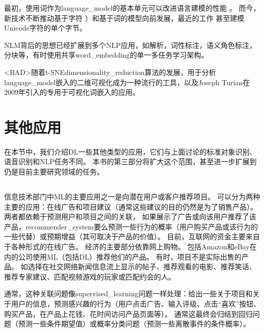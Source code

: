 
最初，使用词作为\gls{language_model}的基本单元可以改进语言建模的性能 \citep{BenDucVin01-small}。
而今，新技术不断推动基于字符 \citep{Sutskever-et-al-ICML2011}）和基于词的模型向前发展，最近的工作 \citep{gillick2015multilingual}甚至建模Unicode字符的单个字节。

\gls{NLM}背后的思想已经扩展到多个\gls{NLP}应用，如解析\citep{Henderson-NAACL2003,Henderson-ACL2004,Collobert-AISTATS2011}，词性标注，语义角色标注，分块等，有时使用共享\gls{word_embedding}的单一多任务学习架构\citep{Collobert+Weston-ICML2008,collobert2011natural}。

<BAD>随着t-SNE\gls{dimensionality_reduction}算法的发展\citep{VanDerMaaten08-small}，用于分析\gls{language_model}嵌入的二维可视化成为一种流行的工具，以及Joseph Turian在2009年引入的专用于可视化词嵌入的应用。

\section{其他应用}
\label{sec:other_applications}

在本节中，我们介绍\gls{DL}一些其他类型的应用，它们与上面讨论的标准对象识别、语音识别和\gls{NLP}任务不同。
本书的第三部分将扩大这个范围，甚至进一步扩展到仍是目前主要研究领域的任务。


\subsection{}
\label{sec:recommender_systems}
信息技术部门中\gls{ML}的主要应用之一是向潜在用户或客户推荐项目。
可以分为两种主要的应用：在线广告和项目建议（通常这些建议的目的仍然是为了销售产品）。
两者都依赖于预测用户和项目之间的关联， 如果展示了广告或向该用户推荐了该产品，\gls{recommender_system}要么预测一些行为的概率（用户购买产品或该行为的一些代替）或预期增益（其可取决于产品的价值）。
目前，互联网的资金主要来自于各种形式的在线广告。
经济的主要部分依靠网上购物。 
包括Amazon和eBay在内的公司使用\gls{ML}（包括\gls{DL}）推荐他们的产品。
有时，项目不是实际出售的产品。
如选择在社交网络新闻信息流上显示的帖子、推荐观看的电影、推荐笑话、推荐专家建议、匹配视频游戏的玩家或匹配约会的人。

通常，这种关联问题像\gls{supervised_learning}问题一样处理：给出一些关于项目和关于用户的信息，预测感兴趣的行为（用户点击广告、输入评级、点击``喜欢''按钮、 购买产品，在产品上花钱、花时间访问产品页面等）。
通常这最终会归结到回归问题（预测一些条件期望值）或概率分类问题（预测一些离散事件的条件概率）。

